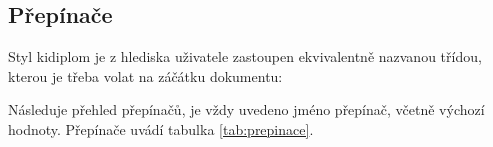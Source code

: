 \documentclass[
  program=itp,
  biblatex,
  figures=false,
  glossaries,
  index
]{kidiplom}
\begin{document}
\subsection{Přepínače}
Styl kidiplom je z hlediska uživatele zastoupen ekvivalentně nazvanou třídou, kterou je třeba volat na záčátku dokumentu:

Následuje přehled přepínačů, je vždy uvedeno jméno přepínač, včetně výchozí hodnoty. Přepínače uvádí tabulka \ref{tab:prepinace}.
\end{document}
